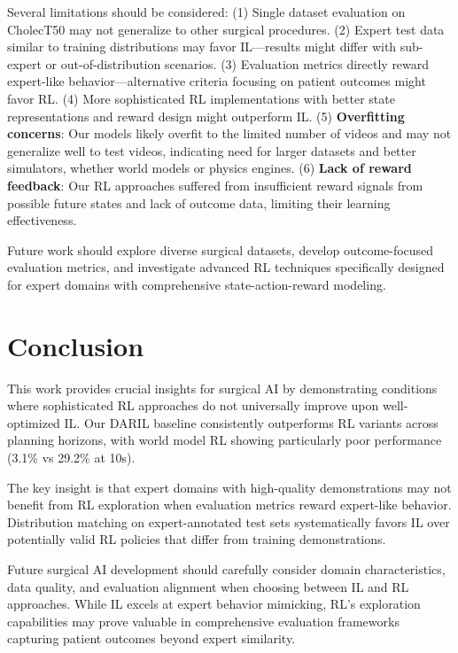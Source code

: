 \documentclass[runningheads]{llncs}
\begin{document}
Several limitations should be considered: (1) Single dataset evaluation on CholecT50 may not generalize to other surgical procedures. (2) Expert test data similar to training distributions may favor IL—results might differ with sub-expert or out-of-distribution scenarios. (3) Evaluation metrics directly reward expert-like behavior—alternative criteria focusing on patient outcomes might favor RL. (4) More sophisticated RL implementations with better state representations and reward design might outperform IL. (5) \textbf{Overfitting concerns}: Our models likely overfit to the limited number of videos and may not generalize well to test videos, indicating need for larger datasets and better simulators, whether world models or physics engines. (6) \textbf{Lack of reward feedback}: Our RL approaches suffered from insufficient reward signals from possible future states and lack of outcome data, limiting their learning effectiveness.

Future work should explore diverse surgical datasets, develop outcome-focused evaluation metrics, and investigate advanced RL techniques specifically designed for expert domains with comprehensive state-action-reward modeling.

\section{Conclusion}

This work provides crucial insights for surgical AI by demonstrating conditions where sophisticated RL approaches do not universally improve upon well-optimized IL. Our DARIL baseline consistently outperforms RL variants across planning horizons, with world model RL showing particularly poor performance (3.1\% vs 29.2\% at 10s).

The key insight is that expert domains with high-quality demonstrations may not benefit from RL exploration when evaluation metrics reward expert-like behavior. Distribution matching on expert-annotated test sets systematically favors IL over potentially valid RL policies that differ from training demonstrations.

Future surgical AI development should carefully consider domain characteristics, data quality, and evaluation alignment when choosing between IL and RL approaches. While IL excels at expert behavior mimicking, RL's exploration capabilities may prove valuable in comprehensive evaluation frameworks capturing patient outcomes beyond expert similarity.

%

\end{document}
